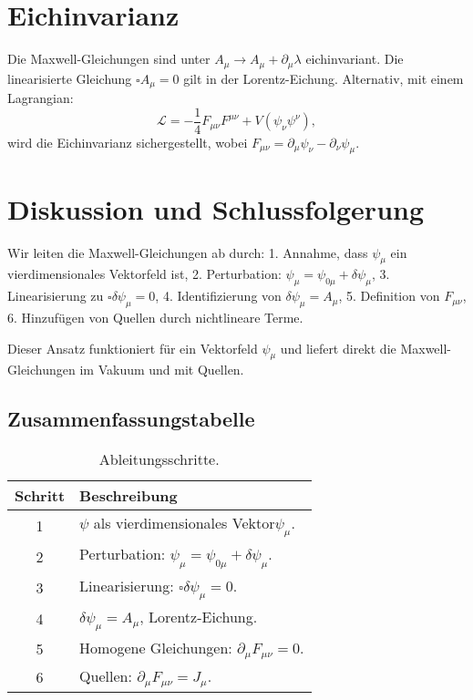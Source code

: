 \documentclass{article}
\begin{document}
	\section{Eichinvarianz}
	Die Maxwell-Gleichungen sind unter \(A_\mu \rightarrow A_\mu + \partial_\mu \lambda\) eichinvariant. Die linearisierte Gleichung \(\square A_\mu = 0\) gilt in der Lorentz-Eichung. Alternativ, mit einem Lagrangian:
	\[
	\mathcal{L} = -\frac{1}{4} F_{\mu\nu} F^{\mu\nu} + V(\psi_\nu \psi^\nu),
	\]
	wird die Eichinvarianz sichergestellt, wobei \(F_{\mu\nu} = \partial_\mu \psi_\nu - \partial_\nu \psi_\mu\).
	
	\section{Diskussion und Schlussfolgerung}
	Wir leiten die Maxwell-Gleichungen ab durch:
	1. Annahme, dass \(\psi_\mu\) ein vierdimensionales Vektorfeld ist,
	2. Perturbation: \(\psi_\mu = \psi_{0\mu} + \delta \psi_\mu\),
	3. Linearisierung zu \(\square \delta \psi_\mu = 0\),
	4. Identifizierung von \(\delta \psi_\mu = A_\mu\),
	5. Definition von \(F_{\mu\nu}\),
	6. Hinzufügen von Quellen durch nichtlineare Terme.
	
	Dieser Ansatz funktioniert für ein Vektorfeld \(\psi_\mu\) und liefert direkt die Maxwell-Gleichungen im Vakuum und mit Quellen.
	
	\subsection{Zusammenfassungstabelle}
	\begin{table}[h]
		\centering
		\begin{tabular}{|c|p{8cm}|}
			\hline
			\textbf{Schritt} & \textbf{Beschreibung} \\
			\hline
			1 & \(\psi\) als vierdimensionales Vektor\(\psi_\mu\). \\
			2 & Perturbation: \(\psi_\mu = \psi_{0\mu} + \delta \psi_\mu\). \\
			3 & Linearisierung: \(\square \delta \psi_\mu = 0\). \\
			4 & \(\delta \psi_\mu = A_\mu\), Lorentz-Eichung. \\
			5 & Homogene Gleichungen: \(\partial_\mu F_{\mu\nu} = 0\). \\
			6 & Quellen: \(\partial_\mu F_{\mu\nu} = J_\mu\). \\
			\hline
		\end{tabular}
		\caption{Ableitungsschritte.}
	\end{table}
	
\end{document}
